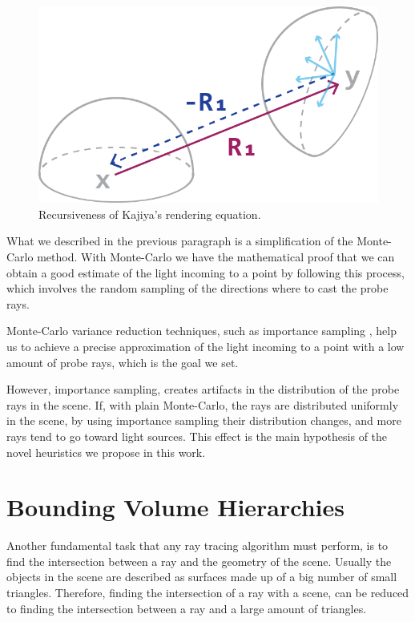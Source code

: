 \documentclass{PoliMi_MasterThesis}
\begin{document}
\begin{figure}[H]
    \centering
    \includegraphics[width=\textwidth*\real{0.4}]{Images/kajiya_recursive.png}
    \caption{Recursiveness of Kajiya's rendering equation.}
    \label{fig:rendering_equation_recursive_intro}
\end{figure}

What we described in the previous paragraph is a simplification of the Monte-Carlo method. With Monte-Carlo we have the mathematical proof that we can obtain a good estimate of the light incoming to a point by following this process, which involves the random sampling of the directions where to cast the probe rays.

Monte-Carlo variance reduction techniques, such as importance sampling \cite{importance_sampling}\cite{multi_light_sampling}, help us to achieve a precise approximation of the light incoming to a point with a low amount of probe rays, which is the goal we set.

However, importance sampling, creates artifacts in the distribution of the probe rays in the scene. If, with plain Monte-Carlo, the rays are distributed uniformly in the scene, by using importance sampling their distribution changes, and more rays tend to go toward light sources. This effect is the main hypothesis of the novel heuristics we propose in this work.

\section*{Bounding Volume Hierarchies}
Another fundamental task that any ray tracing algorithm must perform, is to find the intersection between a ray and the geometry of the scene. Usually the objects in the scene are described as surfaces made up of a big number of small triangles. Therefore, finding the intersection of a ray with a scene, can be reduced to finding the intersection between a ray and a large amount of triangles.
\end{document}
